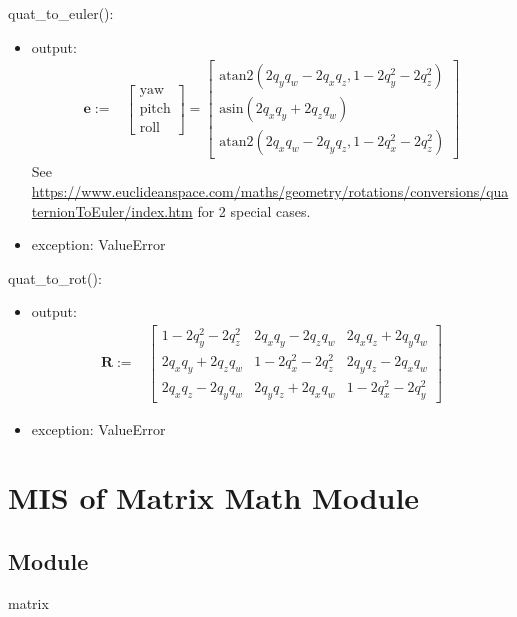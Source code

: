 \documentclass[12pt, titlepage]{article}
\begin{document}
\noindent quat\_to\_euler():
\begin{itemize}
\item output: \begin{align*}
  \mathbf{e} :=& \begin{bmatrix}
    \text{yaw} \\ \text{pitch} \\ \text{roll}
  \end{bmatrix} =
  \begin{bmatrix}
    \text{atan2}(2 q_y q_w - 2 q_x q_z, 1 - 2 q_y^2 - 2 q_z ^ 2) \\
    \text{asin}(2 q_x q_y + 2 q_z q_w) \\
    \text{atan2}(2 q_x q_w - 2 q_y q_z, 1 - 2 q_x^2 - 2 q_z ^2)
  \end{bmatrix}
\end{align*}
See \url{https://www.euclideanspace.com/maths/geometry/rotations/conversions/quaternionToEuler/index.htm} for 2 special cases.
\item exception: ValueError
\end{itemize}

\noindent quat\_to\_rot():
\begin{itemize}
\item output: \begin{align*}
  \mathbf{R}:= & \begin{bmatrix}
    1- 2 q_y^2 - 2 q_z^2 & 2 q_x q_y - 2 q_z q_w & 2 q_x q_z + 2 q_y q_w \\
    2 q_x q_y + 2 q_z q_w & 1 -2 q_x^2 - 2 q_z^2 & 2 q_y q_z - 2 q_x q_w \\
    2 q_x q_z - 2 q_y q_w & 2 q_y q_z + 2 q_x q_w & 1 -2 q_x^2 - 2 q_y ^2
  \end{bmatrix}
\end{align*}
\item exception: ValueError
\end{itemize}

\newpage

\section{MIS of Matrix Math Module} \label{mmm}

\subsection{Module}
matrix
\end{document}

